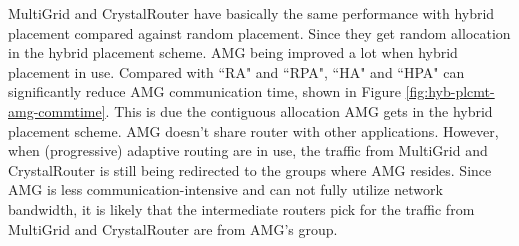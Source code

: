 \documentclass[conference,compsoc]{IEEEtran}
\begin{document}
MultiGrid and CrystalRouter have basically the same performance with hybrid placement compared against random placement. Since they get random allocation in the hybrid placement scheme. AMG being improved a lot when hybrid placement in use. Compared with ``RA" and ``RPA", ``HA" and ``HPA" can significantly reduce AMG communication time, shown in Figure \ref{fig:hyb-plcmt-amg-commtime}. This is due the contiguous allocation AMG gets in the hybrid placement scheme. AMG doesn't share router with other applications. However, when (progressive) adaptive routing are in use, the traffic from MultiGrid and CrystalRouter is still being redirected to the groups where AMG resides. Since AMG is less communication-intensive and can not fully utilize network bandwidth, it is likely that the intermediate routers pick for the traffic from MultiGrid and CrystalRouter are from AMG's group. 





%


\end{document}
